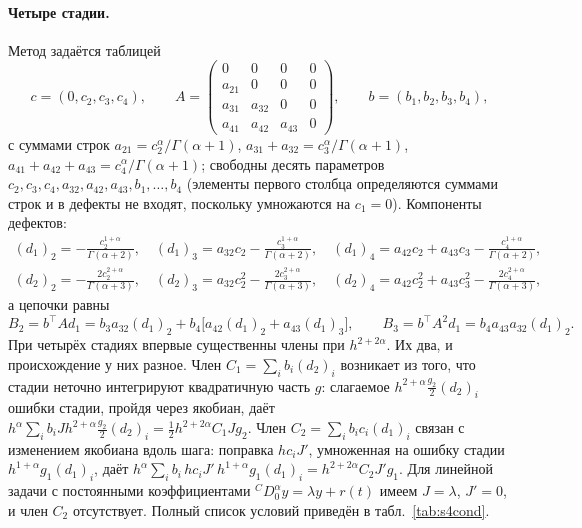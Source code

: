 \documentclass[11pt,a4paper]{article}
\theoremstyle{plain}
\theoremstyle{definition}
\newcommand{\G}{\Gamma}
\begin{document}
\paragraph{Четыре стадии.} Метод задаётся таблицей
\[
c=(0,c_2,c_3,c_4),\qquad A=\begin{pmatrix}0&0&0&0\\a_{21}&0&0&0\\a_{31}&a_{32}&0&0\\a_{41}&a_{42}&a_{43}&0\end{pmatrix},\qquad b=(b_1,b_2,b_3,b_4),
\]
с суммами строк $a_{21}=c_2^{\alpha}/\G(\alpha+1)$, $a_{31}+a_{32}=c_3^{\alpha}/\G(\alpha+1)$, $a_{41}+a_{42}+a_{43}=c_4^{\alpha}/\G(\alpha+1)$; свободны десять параметров $c_2,c_3,c_4,a_{32},a_{42},a_{43},b_1,\dots,b_4$ (элементы первого столбца определяются суммами строк и в дефекты не входят, поскольку умножаются на $c_1=0$). Компоненты дефектов:
\begin{gather*}
(d_1)_2=-\tfrac{c_2^{1+\alpha}}{\G(\alpha+2)},\quad (d_1)_3=a_{32}c_2-\tfrac{c_3^{1+\alpha}}{\G(\alpha+2)},\quad (d_1)_4=a_{42}c_2+a_{43}c_3-\tfrac{c_4^{1+\alpha}}{\G(\alpha+2)},\\
(d_2)_2=-\tfrac{2c_2^{2+\alpha}}{\G(\alpha+3)},\quad (d_2)_3=a_{32}c_2^2-\tfrac{2c_3^{2+\alpha}}{\G(\alpha+3)},\quad (d_2)_4=a_{42}c_2^2+a_{43}c_3^2-\tfrac{2c_4^{2+\alpha}}{\G(\alpha+3)},
\end{gather*}
а цепочки равны
\[
B_2=b^{\top}Ad_1=b_3a_{32}(d_1)_2+b_4\bigl[a_{42}(d_1)_2+a_{43}(d_1)_3\bigr],\qquad B_3=b^{\top}A^2d_1=b_4a_{43}a_{32}(d_1)_2 .
\]
При четырёх стадиях впервые существенны члены при $h^{2+2\alpha}$. Их два, и происхождение у них разное. Член $C_1=\sum_ib_i(d_2)_i$ возникает из того, что стадии неточно интегрируют квадратичную часть $g$: слагаемое $h^{2+\alpha}\frac{g_2}{2}(d_2)_i$ ошибки стадии, пройдя через якобиан, даёт $h^{\alpha}\sum_ib_iJh^{2+\alpha}\frac{g_2}{2}(d_2)_i=\frac12h^{2+2\alpha}C_1Jg_2$. Член $C_2=\sum_ib_ic_i(d_1)_i$ связан с изменением якобиана вдоль шага: поправка $hc_iJ'$, умноженная на ошибку стадии $h^{1+\alpha}g_1(d_1)_i$, даёт $h^{\alpha}\sum_ib_i\,hc_iJ'\,h^{1+\alpha}g_1(d_1)_i=h^{2+2\alpha}C_2J'g_1$. Для линейной задачи с постоянными коэффициентами ${}^{C}\!D^{\alpha}_{0}y=\lambda y+r(t)$ имеем $J=\lambda$, $J'=0$, и член $C_2$ отсутствует. Полный список условий приведён в табл.~\ref{tab:s4cond}.
\end{document}
